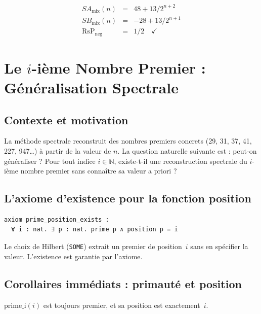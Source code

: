 \documentclass[]{pasj02}
\begin{document}
\begin{eqnarray}
  SA_{\mathrm{mix}}(n) &=& 48 + 13/2^{n+2} \\
  SB_{\mathrm{mix}}(n) &=& -28 + 13/2^{n+1} \\
  \mathrm{RsP}_{\mathrm{neg}} &=& 1/2 \quad\checkmark
\end{eqnarray}

\section{Le $i$-ième Nombre Premier : Généralisation Spectrale}
\label{sec:generalisation}

\subsection{Contexte et motivation}
\label{ssec:contexte}

La méthode spectrale reconstruit des nombres premiers concrets (29, 31, 37,
41, 227, 947\ldots) à partir de la valeur de $n$.  La question naturelle
suivante est : peut-on généraliser ?  Pour tout indice $i \in \mathbb{N}$,
existe-t-il une reconstruction spectrale du $i$-ième nombre premier sans
connaître sa valeur a priori ?

\subsection{L'axiome d'existence pour la fonction position}
\label{ssec:axiome}
\label{hol:prime_position_exists}

\begin{verbatim}
axiom prime_position_exists :
  ∀ i : nat. ∃ p : nat. prime p ∧ position p = i
\end{verbatim}

Le choix de Hilbert (\texttt{SOME}) extrait un premier de position~$i$ sans
en spécifier la valeur.  L'existence est garantie par l'axiome.

\subsection{Corollaires immédiats : primauté et position}
\label{ssec:corollaires}
\label{hol:primaute_position}

\begin{corollary}
  $\mathrm{prime\_i}(i)$ est toujours premier, et sa position est
  exactement~$i$.
\end{corollary}
\end{document}
